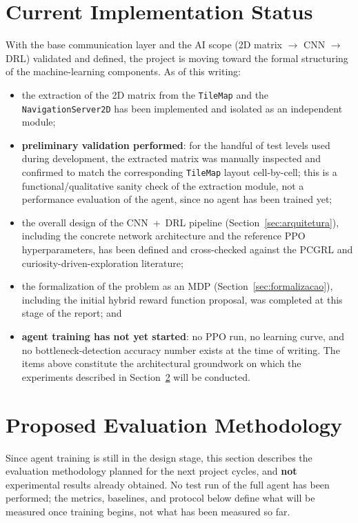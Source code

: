 \documentclass[sigconf,nonacm,language=english]{acmart}
\begin{document}
\section{Current Implementation Status}
\label{sec:estado}

With the base communication layer and the AI scope (2D matrix
$\rightarrow$ CNN $\rightarrow$ DRL) validated and defined, the project is
moving toward the formal structuring of the machine-learning components.
As of this writing:
\begin{itemize}
  \item the extraction of the 2D matrix from the \texttt{TileMap} and the
    \texttt{NavigationServer2D} has been implemented and isolated as an
    independent module;
  \item \textbf{preliminary validation performed}: for the handful of test
    levels used during development, the extracted matrix was manually
    inspected and confirmed to match the corresponding \texttt{TileMap}
    layout cell-by-cell; this is a functional/qualitative sanity check of
    the extraction module, not a performance evaluation of the agent, since
    no agent has been trained yet;
  \item the overall design of the CNN~+~DRL pipeline
    (Section~\ref{sec:arquitetura}), including the concrete network
    architecture and the reference PPO hyperparameters, has been defined
    and cross-checked against the PCGRL and curiosity-driven-exploration
    literature;
  \item the formalization of the problem as an MDP
    (Section~\ref{sec:formalizacao}), including the initial hybrid reward
    function proposal, was completed at this stage of the report; and
  \item \textbf{agent training has not yet started}: no PPO run, no
    learning curve, and no bottleneck-detection accuracy number exists at
    the time of writing. The items above constitute the architectural
    groundwork on which the experiments described in
    Section~\ref{sec:avaliacao} will be conducted.
\end{itemize}

\section{Proposed Evaluation Methodology}
\label{sec:avaliacao}

Since agent training is still in the design stage, this section describes
the evaluation methodology planned for the next project cycles, and
\textbf{not} experimental results already obtained. No test run of the
full agent has been performed; the metrics, baselines, and protocol below
define what will be measured once training begins, not what has been
measured so far.
\end{document}
